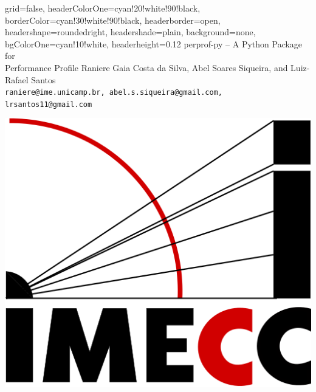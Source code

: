 \documentclass[paperwidth=90cm,paperheight=120cm,portrait]{baposter}
\begin{document}
\begin{poster}{
 grid=false,
 headerColorOne=cyan!20!white!90!black,
 borderColor=cyan!30!white!90!black,
 headerborder=open,
 headershape=roundedright,
 headershade=plain,
 background=none,
 bgColorOne=cyan!10!white,
 headerheight=0.12\textheight}
 {
 }
 {\sffamily perprof-py -- A Python Package  for \\[1mm] Performance Profile}
 { Raniere Gaia Costa da Silva, Abel Soares Siqueira, and Luiz-Rafael  Santos \\[1mm]
 \smaller \texttt{raniere@ime.unicamp.br, abel.s.siqueira@gmail.com, lrsantos11@gmail.com} }
 {
      \begin{minipage}{16em}
        \hfill
        \includegraphics[height=0.06\textheight]{figures/logo-imecc.png}
        \hspace*{.5cm}

\end{minipage}}
\end{poster}
\end{document}
